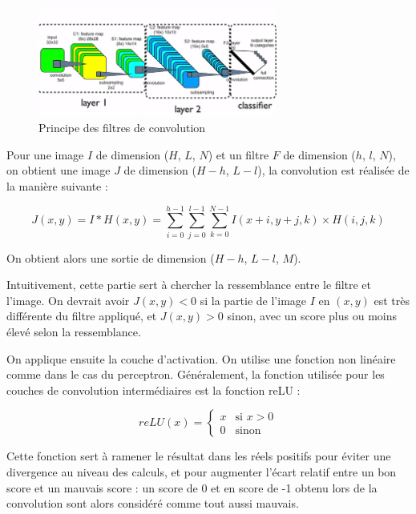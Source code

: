 \begin{figure}[h]
 \centering
 \includegraphics[width=0.7\textwidth]{img/CNN_filtre.png}
 \caption{Principe des filtres de convolution}
\end{figure}

Pour une image $I$ de dimension ($H$, $L$, $N$) et un filtre $F$ de dimension ($h$, $l$, $N$), on obtient une image $J$ de dimension ($H-h$, $L-l$), la convolution est réalisée de la manière suivante :

\begin{equation}
    J(x, y) = I \ast H \left(x, y\right) = \sum_{i=0}^{h - 1} \sum_{j=0}^{l- 1} \sum_{k=0}^{N - 1} I\left(x+i, y+j, k\right) \times H\left(i, j, k\right)
\end{equation}

On obtient alors une sortie de dimension ($H-h$, $L-l$, $M$).

Intuitivement, cette partie sert à chercher la ressemblance entre le filtre et l'image.
On devrait avoir $J(x,y) < 0$ si la partie de l'image $I$ en $(x,y)$ est très différente du filtre appliqué, et $J(x,y) > 0$ sinon, avec un score plus ou moins élevé selon la ressemblance.

On applique ensuite la couche d'activation. On utilise une fonction non linéaire comme dans le cas du perceptron. 
Généralement, la fonction utilisée pour les couches de convolution intermédiaires est la fonction reLU :

\begin{equation}
reLU(x) = \left\{
    \begin{array}{ll}
        x & \mbox{si } x > 0 \\
        0 & \mbox{sinon}
    \end{array}
\right.
\end{equation}

Cette fonction sert à ramener le résultat dans les réels positifs pour éviter une divergence au niveau des calculs, et pour augmenter l'écart relatif entre un bon score et un mauvais score : un score de 0 et en score de -1 obtenu lors de la convolution sont alors considéré comme tout aussi mauvais.

